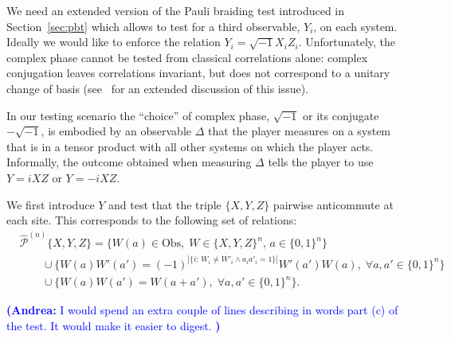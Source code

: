 \documentclass[11pt]{article}
\theoremstyle{remark}
\theoremstyle{definition}
\newcommand{\setft}[1]{\mathrm{#1}}
\newcommand{\Obs}{\setft{Obs}}
\newcommand{\epaulin}{\hat{\mathcal{P}}^{(n)}\!}
\newcommand{\anote}[1]{\textcolor{blue}{\small {\textbf{(Andrea:} #1 \textbf{) }}}}
\begin{document}
We need an extended version of the Pauli braiding test introduced in Section~\ref{sec:pbt} which allows to test for a third observable, $Y_i$, on each system. Ideally we would like to enforce the relation $Y_i=\sqrt{-1}X_iZ_i$. Unfortunately, the complex phase cannot be tested from classical correlations alone: complex conjugation leaves correlations invariant, but does not correspond to a unitary change of basis  (see~\cite[Appendix A]{reichardt2012classicalarxiv} for an extended discussion of this issue). 

In our testing scenario the ``choice'' of complex phase, $\sqrt{-1}$ or its conjugate $-\sqrt{-1}$, is embodied by an observable $\Delta$ that the player measures on a system that is in a tensor product with all other systems on which the player acts. Informally, the outcome obtained when measuring $\Delta$ tells the player to use $Y = i XZ$ or $Y=-iXZ$. 

We first introduce $Y$ and test that the triple $\{X,Y,Z\}$ pairwise anticommute at each site. This corresponds to the following set of relations: 
\begin{align*}
& {\epaulin}\{X,Y,Z\} = \Big\{ W(a)\in\Obs,\;W \in \{X,Y,Z\}^n,\,a\in\{0,1\}^n\Big\} \\
&\qquad\cup \Big\{W(a)W'(a')=(-1)^{|\{i:\,W_i\neq W'_i \wedge a_ia'_i=1\}|} W'(a')W(a),\;\forall a,a'\in\{0,1\}^n\Big\}\\
&\qquad \cup\Big\{ W(a)W(a')=W(a+a'),\;\forall a,a'\in\{0,1\}^n\Big\}.
\end{align*}

\anote{I would spend an extra couple of lines describing in words part (c) of the test. It would make it easier to digest. }
\end{document}
